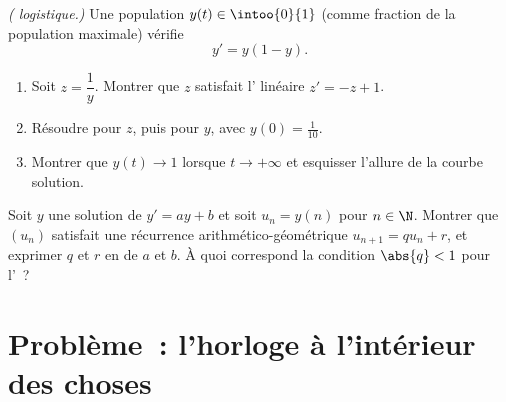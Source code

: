 \begin{exercise}[$\star\star\star$]\label{exo:g12:diffeq:8}
\emph{( logistique.)} Une population $y(t) \in \intoo{0}{1}$ (comme
fraction de la population maximale) vérifie
\[
y' = y(1 - y).
\]
\begin{enumerate}
  \item Soit $z = \dfrac{1}{y}$. Montrer que $z$ satisfait l'
        linéaire $z' = -z + 1$.
  \item Résoudre pour $z$, puis pour $y$, avec $y(0) = \frac{1}{10}$.
  \item Montrer que $y(t) \to 1$ lorsque $t \to +\infty$ et esquisser
        l'allure de la courbe solution.
\end{enumerate}
\end{exercise}

\begin{exercise}[$\star\star\star$]\label{exo:g12:diffeq:9}
Soit $y$ une solution de $y' = ay + b$ et soit $u_n = y(n)$ pour
$n \in \N$. Montrer que $(u_n)$ satisfait une récurrence
arithmético-géométrique $u_{n+1} = q u_n + r$, et exprimer $q$ et $r$ en
 de $a$ et $b$. À quoi correspond la condition $\abs{q} < 1$ pour
l'~?
\end{exercise}

\section{Problème~: l'horloge à l'intérieur des choses}


